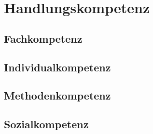 \chapter{Handlungskompetenz}


\section{Fachkompetenz}

\section{Individualkompetenz}

\section{Methodenkompetenz}


\section{Sozialkompetenz}

